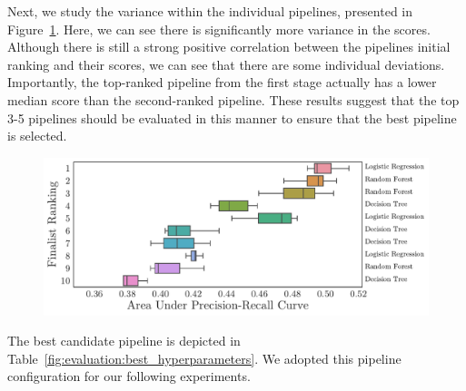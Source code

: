 \documentclass[../thesis/thesis.tex]{subfiles}
\begin{document}
Next, we study the variance within the individual pipelines, presented in Figure~\ref{fig:evaluation:selection_agg_rank}. Here, we can see there is significantly more variance in the scores. Although there is still a strong positive correlation between the pipelines initial ranking and their scores, we can see that there are some individual deviations. Importantly, the top-ranked pipeline from the first stage actually has a lower median score than the second-ranked pipeline. These results suggest that the top 3-5 pipelines should be evaluated in this manner to ensure that the best pipeline is selected.

\begin{figure}[!htb]
    \centering
    \includegraphics[width=\textwidth]{../figures/evaluation/selection_agg_rank}
    \caption[Overview of finalist pipeline performance]{}
    \label{fig:evaluation:selection_agg_rank}
\end{figure}

The best candidate pipeline is depicted in Table~\ref{fig:evaluation:best_hyperparameters}. We adopted this pipeline configuration for our following experiments.

\begin{table}[!htb]
    \centering
    \scalebox{0.8}{}
    \caption[Hyperparameters of best pipeline]{}
    \label{fig:evaluation:best_hyperparameters}
\end{table}

\end{document}
